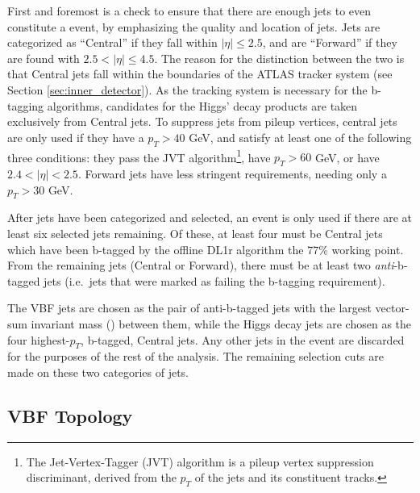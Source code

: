         First and foremost is a check to ensure that there are enough jets to even constitute a \vbfproc event,
            by emphasizing the quality and location of jets.
        Jets are categorized as ``Central'' if they fall within $|\eta| \leq 2.5$,
            and are ``Forward'' if they are found with $ 2.5 < |\eta| \leq 4.5 $.
        The reason for the distinction between the two is that Central jets fall within the boundaries of the ATLAS tracker system
            (see Section \ref{sec:inner_detector}).
        As the tracking system is necessary for the b-tagging algorithms,
            candidates for the Higgs' decay products are taken exclusively from Central jets.
        To suppress jets from pileup vertices, central jets are only used if they have a $p_T > 40$ GeV,
            and satisfy at least one of the following three conditions:
            they pass the JVT algorithm\footnote{
                The Jet-Vertex-Tagger (JVT) algorithm is a pileup vertex suppression discriminant,
                    derived from the $p_T$ of the jets and its constituent tracks\cite{jvt_algo}.
            }, have $p_T > 60$ GeV, or have $2.4 < |\eta| < 2.5$.
        Forward jets have less stringent requirements, needing only a $p_T > 30$ GeV.

        After jets have been categorized and selected, an event is only used if there are at least six selected jets remaining.
        Of these, at least four must be Central jets which have been b-tagged by the offline DL1r algorithm the 77\% working point.
        From the remaining jets (Central or Forward), there must be at least two \textit{anti}-b-tagged jets
            (i.e.\ jets that were marked as failing the b-tagging requirement).

        The VBF jets are chosen as the pair of anti-b-tagged jets with the largest vector-sum invariant mass (\mjj) between them,
            while the Higgs decay jets are chosen as the four highest-$p_T$, b-tagged, Central jets.
        Any other jets in the event are discarded for the purposes of the rest of the analysis.
        The remaining selection cuts are made on these two categories of jets.
        


    \subsection{VBF Topology}

